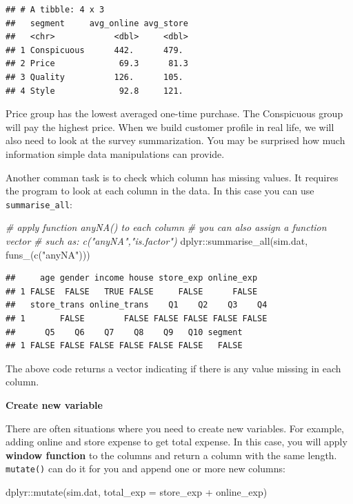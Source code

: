 \documentclass[
  12pt,
]{krantz}
\makeatletter
\newenvironment{Shaded}{\begin{snugshade}}{\end{snugshade}}
\newcommand{\AttributeTok}[1]{\textcolor[rgb]{0.61,0.61,0.61}{#1}}
\newcommand{\CommentTok}[1]{\textcolor[rgb]{0.37,0.37,0.37}{\textit{#1}}}
\newcommand{\FunctionTok}[1]{\textcolor[rgb]{0,0,0}{#1}}
\newcommand{\NormalTok}[1]{#1}
\newcommand{\SpecialCharTok}[1]{\textcolor[rgb]{0,0,0}{#1}}
\newcommand{\StringTok}[1]{\textcolor[rgb]{0.5,0.5,0.5}{#1}}
\newenvironment{kframe}{%
\medskip{}
\setlength{\fboxsep}{.8em}
 \def\at@end@of@kframe{}%
 \ifinner\ifhmode%
  \def\at@end@of@kframe{\end{minipage}}%
  \begin{minipage}{\columnwidth}%
 \fi\fi%
 \def\FrameCommand##1{\hskip\@totalleftmargin \hskip-\fboxsep
 \colorbox{shadecolor}{##1}\hskip-\fboxsep
     \hskip-\linewidth \hskip-\@totalleftmargin \hskip\columnwidth}%
 \MakeFramed {\advance\hsize-\width
   \@totalleftmargin\z@ \linewidth\hsize
   \@setminipage}}%
 {\par\unskip\endMakeFramed%
 \at@end@of@kframe}
\renewenvironment{Shaded}{\begin{kframe}}{\end{kframe}}
\makeatother
\begin{document}
\begin{verbatim}
## # A tibble: 4 x 3
##   segment     avg_online avg_store
##   <chr>            <dbl>     <dbl>
## 1 Conspicuous      442.      479. 
## 2 Price             69.3      81.3
## 3 Quality          126.      105. 
## 4 Style             92.8     121.
\end{verbatim}

Price group has the lowest averaged one-time purchase. The Conspicuous group will pay the highest price. When we build customer profile in real life, we will also need to look at the survey summarization. You may be surprised how much information simple data manipulations can provide.

Another comman task is to check which column has missing values. It requires the program to look at each column in the data. In this case you can use \texttt{summarise\_all}:

\begin{Shaded}
\begin{Highlighting}[]
\CommentTok{\# apply function anyNA() to each column}
\CommentTok{\# you can also assign a function vector }
\CommentTok{\# such as: c("anyNA","is.factor")}
\NormalTok{dplyr}\SpecialCharTok{::}\FunctionTok{summarise\_all}\NormalTok{(sim.dat, }\FunctionTok{funs\_}\NormalTok{(}\FunctionTok{c}\NormalTok{(}\StringTok{"anyNA"}\NormalTok{)))}
\end{Highlighting}
\end{Shaded}

\begin{verbatim}
##     age gender income house store_exp online_exp
## 1 FALSE  FALSE   TRUE FALSE     FALSE      FALSE
##   store_trans online_trans    Q1    Q2    Q3    Q4
## 1       FALSE        FALSE FALSE FALSE FALSE FALSE
##      Q5    Q6    Q7    Q8    Q9   Q10 segment
## 1 FALSE FALSE FALSE FALSE FALSE FALSE   FALSE
\end{verbatim}

The above code returns a vector indicating if there is any value missing in each column.

\textbf{Create new variable}

There are often situations where you need to create new variables. For example, adding online and store expense to get total expense. In this case, you will apply \textbf{window function} to the columns and return a column with the same length. \texttt{mutate()} can do it for you and append one or more new columns:

\begin{Shaded}
\begin{Highlighting}[]
\NormalTok{dplyr}\SpecialCharTok{::}\FunctionTok{mutate}\NormalTok{(sim.dat, }\AttributeTok{total\_exp =}\NormalTok{ store\_exp }\SpecialCharTok{+}\NormalTok{ online\_exp)}
\end{Highlighting}
\end{Shaded}
\end{document}
